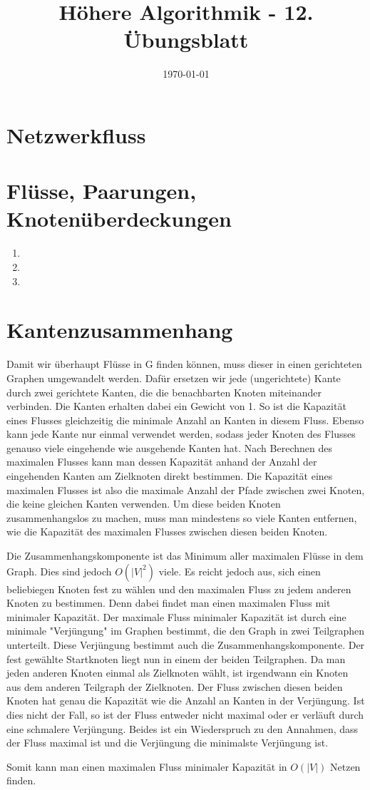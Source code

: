 \documentclass[a4paper,10pt]{article}
\title{H\"ohere Algorithmik - 12. \"Ubungsblatt}
\author{\Authors}
\date{\today}
\begin{document}
\maketitle

\section{Netzwerkfluss}

\section{Flüsse, Paarungen, Knotenüberdeckungen}
\begin{enumerate}
\item
\item
\item
\end{enumerate}

\section{Kantenzusammenhang}
Damit wir überhaupt Flüsse in G finden können, muss dieser in einen gerichteten Graphen umgewandelt werden. Dafür ersetzen wir jede (ungerichtete) Kante durch zwei gerichtete Kanten, die die benachbarten Knoten miteinander verbinden. Die Kanten erhalten dabei ein Gewicht von 1. So ist die Kapazität eines Flusses gleichzeitig die minimale Anzahl an Kanten in diesem Fluss. Ebenso kann jede Kante nur einmal verwendet werden, sodass jeder Knoten des Flusses genauso viele eingehende wie ausgehende Kanten hat. Nach Berechnen des maximalen Flusses kann man dessen Kapazität anhand der Anzahl der eingehenden Kanten am Zielknoten direkt bestimmen. Die Kapazität eines maximalen Flusses ist also die maximale Anzahl der Pfade zwischen zwei Knoten, die keine gleichen Kanten verwenden.
Um diese beiden Knoten zusammenhangslos zu machen, muss man mindestens so viele Kanten entfernen, wie die Kapazität des maximalen Flusses zwischen diesen beiden Knoten.

Die Zusammenhangskomponente ist das Minimum aller maximalen Flüsse in dem Graph. Dies sind jedoch $O(|V|^2)$ viele.
Es reicht jedoch aus, sich einen beliebiegen Knoten fest zu wählen und den maximalen Fluss zu jedem anderen Knoten zu bestimmen. Denn dabei findet man einen maximalen Fluss mit minimaler Kapazität. Der maximale Fluss minimaler Kapazität ist durch eine minimale "Verjüngung" im Graphen bestimmt, die den Graph in zwei Teilgraphen unterteilt. Diese Verjüngung bestimmt auch die Zusammenhangskomponente. Der fest gewählte Startknoten liegt nun in einem der beiden Teilgraphen. Da man jeden anderen Knoten einmal als Zielknoten wählt, ist irgendwann ein Knoten aus dem anderen Teilgraph der Zielknoten. Der Fluss zwischen diesen beiden Knoten hat genau die Kapazität wie die Anzahl an Kanten in der Verjüngung. Ist dies nicht der Fall, so ist der Fluss entweder nicht maximal oder er verläuft durch eine schmalere Verjüngung. Beides ist ein Wiederspruch zu den Annahmen, dass der Fluss maximal ist und die Verjüngung die minimalste Verjüngung ist.

Somit kann man einen maximalen Fluss minimaler Kapazität in $O(|V|)$ Netzen finden.
\end{document}
